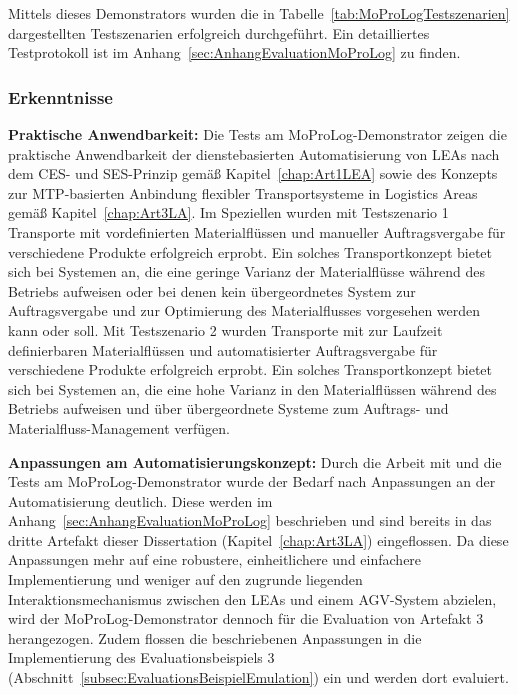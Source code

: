 \newpage

Mittels dieses Demonstrators wurden die in Tabelle~\ref{tab:MoProLogTestszenarien} dargestellten Testszenarien erfolgreich durchgeführt. Ein detailliertes Testprotokoll ist im Anhang~\ref{sec:AnhangEvaluationMoProLog} zu finden.

\subsubsection{Erkenntnisse}

\textbf{Praktische Anwendbarkeit:} Die Tests am MoProLog-Demonstrator zeigen die praktische Anwendbarkeit der dienstebasierten Automatisierung von LEAs nach dem CES- und SES-Prinzip gemäß Kapitel~\ref{chap:Art1LEA} sowie des Konzepts zur MTP-basierten Anbindung flexibler Transportsysteme in Logistics Areas gemäß Kapitel~\ref{chap:Art3LA}. Im Speziellen wurden mit Testszenario 1 Transporte mit vordefinierten Materialflüssen und manueller Auftragsvergabe für verschiedene Produkte erfolgreich erprobt. Ein solches Transportkonzept bietet sich bei Systemen an, die eine geringe Varianz der Materialflüsse während des Betriebs aufweisen oder bei denen kein übergeordnetes System zur Auftragsvergabe und zur Optimierung des Materialflusses vorgesehen werden kann oder soll. Mit Testszenario 2 wurden Transporte mit zur Laufzeit definierbaren Materialflüssen und automatisierter Auftragsvergabe für verschiedene Produkte erfolgreich erprobt. Ein solches Transportkonzept bietet sich bei Systemen an, die eine hohe Varianz in den Materialflüssen während des Betriebs aufweisen und über übergeordnete Systeme zum Auftrags- und Materialfluss-Management verfügen.

\textbf{Anpassungen am Automatisierungskonzept:} Durch die Arbeit mit und die Tests am MoProLog-Demonstrator wurde der Bedarf nach Anpassungen an der Automatisierung deutlich. Diese werden im Anhang~\ref{sec:AnhangEvaluationMoProLog} beschrieben und sind bereits in das dritte Artefakt dieser Dissertation (Kapitel~\ref{chap:Art3LA}) eingeflossen. Da diese Anpassungen mehr auf eine robustere, einheitlichere und einfachere Implementierung und weniger auf den zugrunde liegenden Interaktionsmechanismus zwischen den LEAs und einem AGV-System abzielen, wird der MoProLog-Demonstrator dennoch für die Evaluation von Artefakt 3 herangezogen. Zudem flossen die beschriebenen Anpassungen in die Implementierung des Evaluationsbeispiels 3 (Abschnitt~\ref{subsec:EvaluationsBeispielEmulation}) ein und werden dort evaluiert. 

